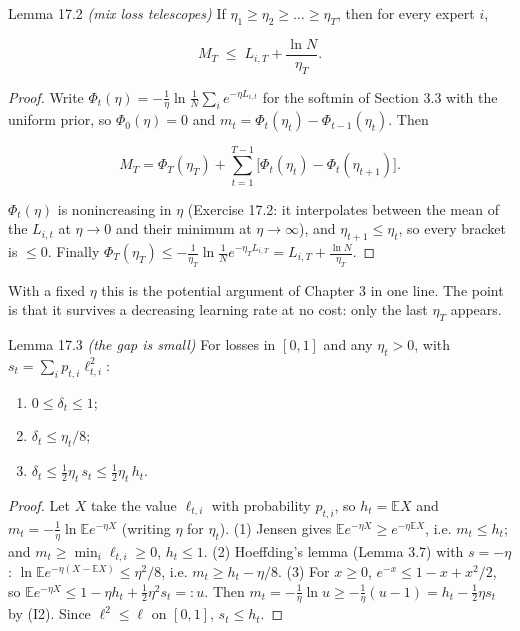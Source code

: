 \documentclass[11pt,a4paper,openany]{book}
\newcommand{\E}{\mathbb{E}}
\begin{document}
\begin{bthm}{Lemma 17.2 \emph{(mix loss telescopes)}}
If $\eta_1\ge\eta_2\ge\dots\ge\eta_T$, then for every expert $i$,

\[M_T\;\le\;L_{i,T}+\frac{\ln N}{\eta_T}.\]

\end{bthm}

\begin{proof}
Write $\Phi_t(\eta)=-\frac1\eta\ln\frac1N\sum_ie^{-\eta L_{i,t}}$ for the softmin of Section 3.3 with the uniform prior, so $\Phi_0(\eta)=0$ and $m_t=\Phi_t(\eta_t)-\Phi_{t-1}(\eta_t)$. Then

\[M_T=\Phi_T(\eta_T)+\sum_{t=1}^{T-1}\big[\Phi_t(\eta_t)-\Phi_t(\eta_{t+1})\big].\]

$\Phi_t(\eta)$ is nonincreasing in $\eta$ (Exercise 17.2: it interpolates between the mean of the $L_{i,t}$ at $\eta\to0$ and their minimum at $\eta\to\infty$), and $\eta_{t+1}\le\eta_t$, so every bracket is $\le0$. Finally $\Phi_T(\eta_T)\le-\frac1{\eta_T}\ln\frac1Ne^{-\eta_TL_{i,T}}=L_{i,T}+\frac{\ln N}{\eta_T}$.
\end{proof}

With a fixed $\eta$ this is the potential argument of Chapter 3 in one line. The point is that it survives a decreasing learning rate at no cost: only the last $\eta_T$ appears.

\begin{bthm}{Lemma 17.3 \emph{(the gap is small)}}
For losses in $[0,1]$ and any $\eta_t>0$, with $s_t=\sum_ip_{t,i}\ell_{t,i}^2$:

\begin{enumerate}
\item $0\le\delta_t\le1$;
\item $\delta_t\le\eta_t/8$;
\item $\delta_t\le\tfrac12\eta_t\,s_t\le\tfrac12\eta_t\,h_t$.
\end{enumerate}
\end{bthm}

\begin{proof}
Let $X$ take the value $\ell_{t,i}$ with probability $p_{t,i}$, so $h_t=\E X$ and $m_t=-\frac1{\eta}\ln\E e^{-\eta X}$ (writing $\eta$ for $\eta_t$). (1) Jensen gives $\E e^{-\eta X}\ge e^{-\eta\E X}$, i.e. $m_t\le h_t$; and $m_t\ge\min_i\ell_{t,i}\ge0$, $h_t\le1$. (2) Hoeffding's lemma (Lemma 3.7) with $s=-\eta$: $\ln\E e^{-\eta(X-\E X)}\le\eta^2/8$, i.e. $m_t\ge h_t-\eta/8$. (3) For $x\ge0$, $e^{-x}\le1-x+x^2/2$, so $\E e^{-\eta X}\le1-\eta h_t+\tfrac12\eta^2s_t=:u$. Then $m_t=-\frac1\eta\ln u\ge-\frac1\eta(u-1)=h_t-\tfrac12\eta s_t$ by (I2). Since $\ell^2\le\ell$ on $[0,1]$, $s_t\le h_t$.
\end{proof}
\end{document}
